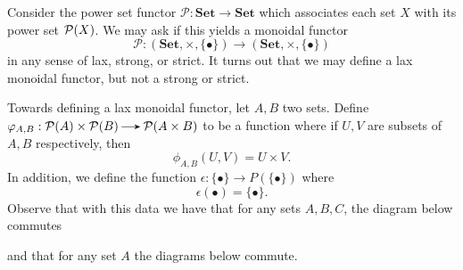 \begin{example}
    Consider the power set functor $\mathcal{P}: \textbf{Set} \to \textbf{Set}$
    which associates each set $X$ with its power set $\mathcal{P}(X)$. We may 
    ask if this yields a monoidal functor 
    \[
        \mathcal{P}: (\textbf{Set}, \times, \{\bullet\}) \to (\textbf{Set}, \times, \{\bullet\})
    \]
    in any sense of lax, strong, or strict. It turns out that we may define a lax monoidal 
    functor, but not a strong or strict. 

    Towards defining a lax monoidal functor, let $A, B$ two sets. Define 
    $\phi_{A,B}: \pp(A)\times\pp(B) \to \pp(A \times B)$ to be a function where if 
    $U, V$ are subsets of $A, B$ respectively, then
    \[
        \phi_{A,B}(U, V) = U \times V.     
    \]
    In addition, we define the function $\epsilon: \{\bullet\}
    \to P(\{\bullet\})$ where 
    \[
        \epsilon(\bullet) = \{\bullet\}.
    \]
    Observe that with this data we have that for any
    sets $A,B,C$, the diagram below commutes
    \begin{center}
    \end{center}
    and that for any set $A$ the diagrams below commute.
    \begin{center}  

\end{center}
\end{example}
